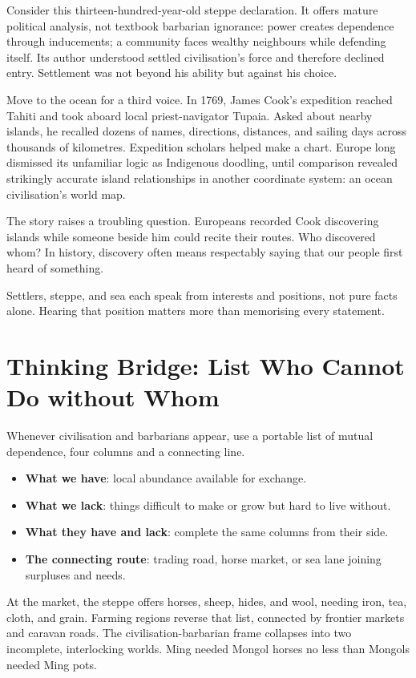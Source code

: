 Consider this thirteen-hundred-year-old steppe declaration. It offers mature political analysis, not textbook barbarian ignorance: power creates dependence through inducements; a community faces wealthy neighbours while defending itself. Its author understood settled civilisation's force and therefore declined entry. Settlement was not beyond his ability but against his choice.

Move to the ocean for a third voice. In 1769, James Cook's expedition reached Tahiti and took aboard local priest-navigator Tupaia. Asked about nearby islands, he recalled dozens of names, directions, distances, and sailing days across thousands of kilometres. Expedition scholars helped make a chart. Europe long dismissed its unfamiliar logic as Indigenous doodling, until comparison revealed strikingly accurate island relationships in another coordinate system: an ocean civilisation's world map.

The story raises a troubling question. Europeans recorded Cook discovering islands while someone beside him could recite their routes. Who discovered whom? In history, discovery often means respectably saying that our people first heard of something.

Settlers, steppe, and sea each speak from interests and positions, not pure facts alone. Hearing that position matters more than memorising every statement.

\section[Thinking Bridge: Mutual Dependence]{Thinking Bridge: List Who Cannot Do without Whom}
Whenever civilisation and barbarians appear, use a portable list of mutual dependence, four columns and a connecting line.

\begin{itemize}
\item \textbf{What we have}: local abundance available for exchange.
\item \textbf{What we lack}: things difficult to make or grow but hard to live without.
\item \textbf{What they have and lack}: complete the same columns from their side.
\item \textbf{The connecting route}: trading road, horse market, or sea lane joining surpluses and needs.
\end{itemize}
At the market, the steppe offers horses, sheep, hides, and wool, needing iron, tea, cloth, and grain. Farming regions reverse that list, connected by frontier markets and caravan roads. The civilisation-barbarian frame collapses into two incomplete, interlocking worlds. Ming needed Mongol horses no less than Mongols needed Ming pots.

